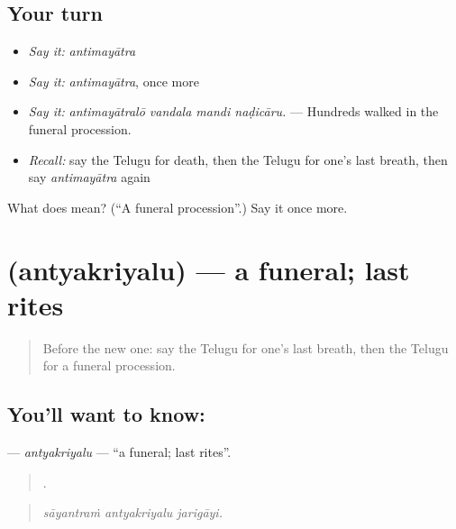 \subsection*{Your turn}
\begin{itemize}
\raggedright
  \item \emph{Say it:} \emph{antimayātra}
  \item \emph{Say it:} \emph{antimayātra}, once more
  \item \emph{Say it:} \emph{antimayātralō vandala mandi naḍicāru.} — Hundreds walked in the funeral procession.
  \item \emph{Recall:} say the Telugu for death, then the Telugu for one's last breath, then say \emph{antimayātra} again
\end{itemize}

\begin{tcolorbox}[breakable,colback=teal!4,colframe=teal!35!black,title={Before you move on}]
What does  mean? (\textquotedblleft{}A funeral procession\textquotedblright{}.) Say it once more.
\end{tcolorbox}
\section[\texorpdfstring{\te{అంత్యక్రియలు} (antyakriyalu)}{అంత్యక్రియలు (antyakriyalu)}]{ (antyakriyalu) — a funeral; last rites}

\label{lesson:TE-C344-antyakriyalu}



\begin{quote}
Before the new one: say the Telugu for one's last breath, then the Telugu for a funeral procession.
\end{quote}

\subsection*{You'll want to know: }
\textbf{} — \emph{antyakriyalu} — \textquotedblleft{}a funeral; last rites\textquotedblright{}.

\begin{quote}
  .
\end{quote}

\begin{quote}
\emph{sāyantraṁ antyakriyalu jarigāyi.}
\end{quote}


